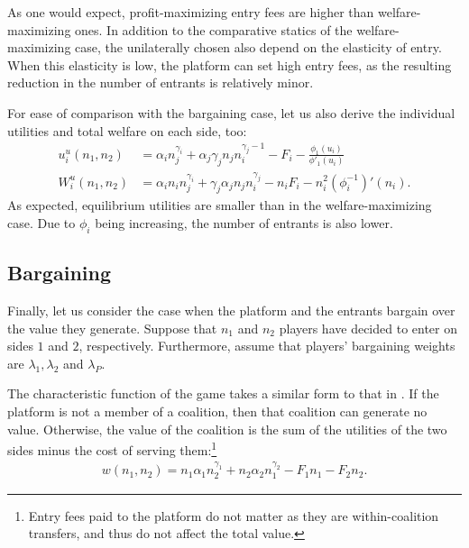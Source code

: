 \documentclass[a4paper]{article}
\begin{document}
As one would expect, profit-maximizing entry fees are higher than welfare-maximizing ones.
In addition to the comparative statics of the welfare-maximizing case, the unilaterally chosen also depend on the elasticity of entry.
When this elasticity is low, the platform can set high entry fees, as the resulting reduction in the number of entrants is relatively minor.

For ease of comparison with the bargaining case, let us also derive the individual utilities and total welfare on each side, too:
\begin{align*}
    u_i^u(n_1, n_2) &= \alpha_i n_j ^ {\gamma_i} + \alpha_j \gamma_j n_j n_i^{\gamma_j - 1} - F_i - \frac{\phi_1(u_i)}{\phi'_1(u_i)} \\
    W_i^u(n_1, n_2) &= \alpha_i n_i n_j ^ {\gamma_i} + \gamma_j \alpha_j n_j n_i^{\gamma_j} - n_i F_i - n_i^2 (\phi_i^{-1})'(n_i).
\end{align*}
As expected, equilibrium utilities are smaller than in the welfare-maximizing case.
Due to $\phi_i$ being increasing, the number of entrants is also lower.

\subsection{Bargaining}

Finally, let us consider the case when the platform and the entrants bargain over the value they generate.
Suppose that $n_1$ and $n_2$ players have decided to enter on sides $1$ and $2$, respectively.
Furthermore, assume that players' bargaining weights are $\lambda_1, \lambda_2$ and $\lambda_P$.

The characteristic function of the game takes a similar form to that in .
If the platform is not a member of a coalition, then that coalition can generate no value.
Otherwise, the value of the coalition is the sum of the utilities of the two sides minus the cost of serving them:\footnote{
    Entry fees paid to the platform do not matter as they are within-coalition transfers, and thus do not affect the total value.
}
\begin{align*}
    w(n_1, n_2) = n_1 \alpha_1 n_2^{\gamma_1} + n_2 \alpha_2 n_1^{\gamma_2} - F_1 n_1 - F_2 n_2.
\end{align*}
\end{document}
